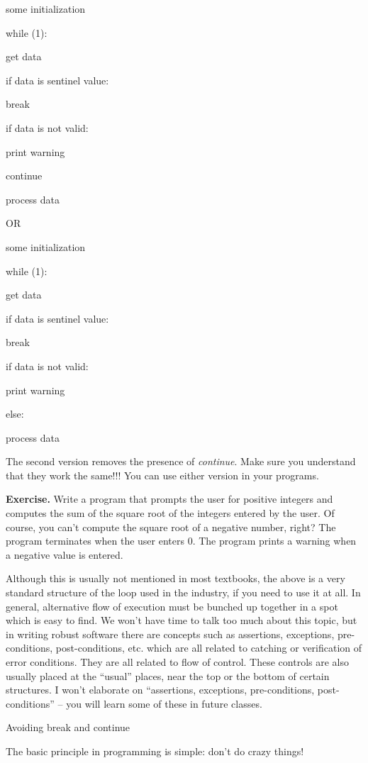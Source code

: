 \documentclass[
]{article}
\begin{document}
some initialization

while (1):

get data

if data is sentinel value:

break

if data is not valid:

print warning

continue

process data

OR

some initialization

while (1):

get data

if data is sentinel value:

break

if data is not valid:

print warning

else:

process data

The second version removes the presence of \emph{continue}. Make sure
you understand that they work the same!!! You can use either version in
your programs.

\textbf{Exercise.} Write a program that prompts the user for positive
integers and computes the sum of the square root of the integers entered
by the user. Of course, you can't compute the square root of a negative
number, right? The program terminates when the user enters 0. The
program prints a warning when a negative value is entered.

Although this is usually not mentioned in most textbooks, the above is a
very standard structure of the loop used in the industry, if you need to
use it at all. In general, alternative flow of execution must be bunched
up together in a spot which is easy to find. We won't have time to talk
too much about this topic, but in writing robust software there are
concepts such as assertions, exceptions, pre-conditions,
post-conditions, etc. which are all related to catching or verification
of error conditions. They are all related to flow of control. These
controls are also usually placed at the ``usual'' places, near the top
or the bottom of certain structures. I won't elaborate on ``assertions,
exceptions, pre-conditions, post-conditions'' -- you will learn some of
these in future classes.

Avoiding break and continue

The basic principle in programming is simple: don't do crazy things!
\end{document}

